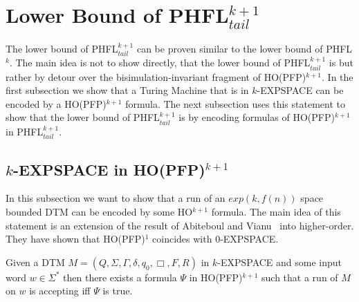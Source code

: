 
\section{Lower Bound of PHFL$^{k + 1}_{tail}$}\label{sec:lowerBoundOfPhflTail}

The lower bound of PHFL$^{k+1}_{tail}$ can be proven similar to the lower bound of PHFL$^k$. The main idea is not to
show directly, that the lower bound of PHFL$^{k+1}_{tail}$ is  but rather by detour over the
bisimulation-invariant fragment of HO(PFP)$^{k+1}$. In the first subsection we show that a Turing Machine that is in
$k$-EXPSPACE can be encoded by a HO(PFP)$^{k+1}$ formula. The next subsection uses this statement to show that the
lower bound of PHFL$^{k+1}_{tail}$ is  by encoding formulas of HO(PFP)$^{k+1}$ in PHFL$^{k+1}_{tail}$.

\subsection{$k$-EXPSPACE in HO(PFP)$^{k+1}$}\label{subsec:kExpspaceInHopfp}

In this subsection we want to show that a run of an $exp(k, f(n))$ space bounded DTM can be encoded by some
HO$^{k+1}$ formula. The main idea of this statement is an extension of the result of Abiteboul and
Vianu~\cite{abiteboul1995computing} into higher-order. They have shown that HO(PFP)$^1$ coincides with $0$-EXPSPACE.


\begin{lemma}
    \label{lemma:expspace_in_ho_pfp}
    Given a DTM $M = (Q, \Sigma, \Gamma, \delta, q_0, \Box, F, R)$ in $k$-EXPSPACE and some input word $w \in
    \Sigma^*$ then there exists a formula $\Psi$ in HO(PFP)$^{k+1}$ such that a run of $M$ on $w$ is accepting iff
    $\Psi$ is true.
\end{lemma}

